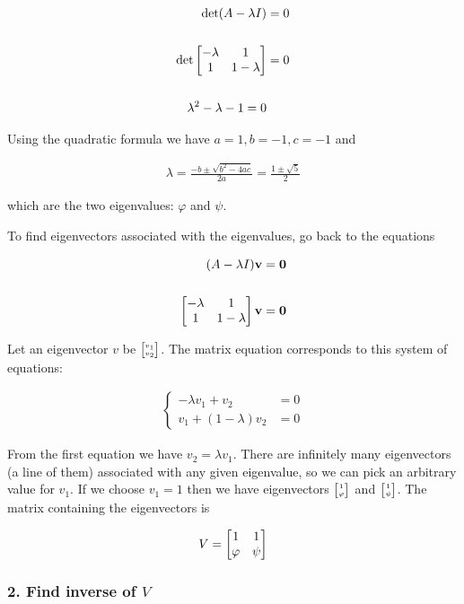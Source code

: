 \begin{lemma}
\begin{align*}
\det (A - \lambda I) &= 0
\\
\\
\det \begin{bmatrix}-\lambda & 1\\1           & 1 - \lambda\\ \end{bmatrix} &= 0
\\
\\
\lambda^2 - \lambda - 1 = 0
\end{align*}

Using the quadratic formula we have $a=1, b=-1, c=-1$ and

\begin{align*}
\lambda
= \frac{-b \pm \sqrt{b^2 - 4ac}}{2a}
= \frac{1 \pm \sqrt{5}}{2}
\end{align*}

which are the two eigenvalues: $\varphi$ and $\psi$.

To find eigenvectors associated with the eigenvalues, go back to the equations

\begin{align*}
(A - \lambda I)\mathbf v &= \mathbf 0
\\
\\
\begin{bmatrix}-\lambda & 1\\1        & 1 - \lambda\\ \end{bmatrix} \mathbf v &= \mathbf 0
\end{align*}

Let an eigenvector $v$ be $\tiny{\begin{bmatrix}v_1\\v_2\end{bmatrix}}$. The matrix equation corresponds
to this system of equations:

\begin{align*}
\begin{cases}
-\lambda v_1 + v_2               &= 0\\
v_1          + (1 - \lambda) v_2 &= 0
\end{cases}
\end{align*}

From the first equation we have $v_2 = \lambda v_1$. There are infinitely many
eigenvectors (a line of them) associated with any given eigenvalue, so we can
pick an arbitrary value for $v_1$. If we choose $v_1 = 1$ then we have
eigenvectors $\tiny{\begin{bmatrix}1\\\varphi\end{bmatrix}}$ and $\tiny{\begin{bmatrix}1\\\psi\end{bmatrix}}$. The matrix
containing the eigenvectors is

\begin{align*}
V = \begin{bmatrix}1 & 1\\\varphi & \psi\\ \end{bmatrix}
\end{align*}

\subsubsection{2. Find inverse of $V$}



\end{lemma}
